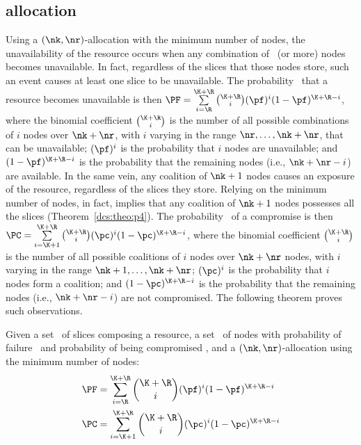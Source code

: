 \subsection{\compact allocation}\label{dcs:sec:minnode}

Using a $(\nk,\nr)$-allocation with the minimum number of nodes, the
unavailability of the resource occurs when any combination of \nr\ (or
more) nodes becomes unavailable. In fact, regardless of the slices
that those nodes store, such an event causes at least one slice to be
unavailable.  The probability \PF\ that a resource becomes unavailable
is then $\PF= \sum\limits_{i={\R}}^{{\K}+{\R}} {{\K+\R}\choose{i}}
(\pf)^i (1 - \pf)^{{\K}+{\R}-i}$, where the binomial coefficient
${{\K+\R}\choose{i}}$ is the number of all possible combinations of
$i$ nodes over $\nk+\nr$, with $i$ varying in the range
$\nr,\ldots,\nk+\nr$, that can be unavailable; $(\pf)^{i}$ is the
probability that $i$ nodes are unavailable; and $(1 -
\pf)^{{\K}+{\R}-i}$ is the probability that the remaining nodes (i.e.,
$\nk+\nr-i$) are available.  In the same vein, any coalition of
$\nk+1$ nodes causes an exposure of the resource, regardless of the
slices they store. Relying on the minimum number of nodes, in fact,
implies that any coalition of $\nk+1$ nodes possesses all the slices
(Theorem~\ref{dcs:theo:p4}).  The probability \PC\ of a compromise is then
$\PC= \sum\limits_{i={\K}+1}^{{\K}+{\R}} {{\K+\R}\choose{i}} (\pc)^i
(1 - \pc)^{{\K}+{\R}-i}$, where the binomial coefficient
${{\K+\R}\choose{i}}$ is the number of all possible coalitions of $i$
nodes over $\nk+\nr$ nodes, with $i$ varying in the range
$\nk+1,\ldots,\nk+\nr$; $(\pc)^i$ is the probability that $i$ nodes
form a coalition; and $(1 - \pc)^{{\K}+{\R}-i}$ is the probability
that the remaining nodes (i.e., $\nk+\nr-i$) are not compromised.  The
following theorem proves such observations.


\smallskip
\begin{theorem}\label{dcs:teo:security-kompact}
Given a set \Shards\ of slices composing a resource, a set \Nodes\ of
nodes with probability of failure \pf\ and probability of being
compromised \pc, and a $(\nk,\nr)$-allocation using the minimum number
of nodes:
	\begin{align*}
		  & \PF = \sum\limits_{i={\R}}^{{\K}+{\R}} {{\K+\R}\choose{i}} (\pf)^i (1 - \pf)^{{\K}+{\R}-i} \\
		  & \PC = \sum\limits_{i={\K}+1}^{{\K}+{\R}}{{\K+\R}\choose{i}} (\pc)^i (1 - \pc)^{{\K}+{\R}-i}
	\end{align*}
\end{theorem}
\smallskip



